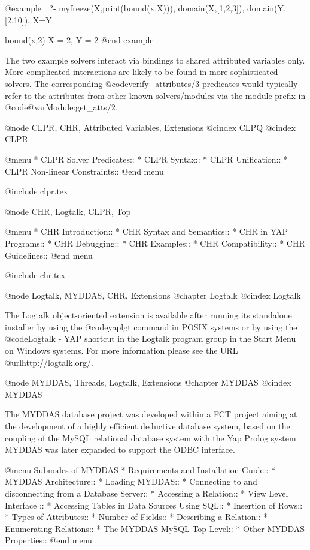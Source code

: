{{{{{{{{{@example
| ?- myfreeze(X,print(bound(x,X))), domain(X,[1,2,3]),
     domain(Y,[2,10]), X=Y.

bound(x,2)                      %
X = 2,                          %
Y = 2
@end example

The two example solvers interact via bindings to shared attributed
variables only.  More complicated interactions are likely to be found
in more sophisticated solvers.  The corresponding
@code{verify_attributes/3} predicates would typically refer to the
attributes from other known solvers/modules via the module prefix in
@code{@var{Module}:get_atts/2}.

@node CLPR, CHR, Attributed Variables, Extensions
@cindex CLPQ
@cindex CLPR

@menu
* CLPR Solver Predicates::
* CLPR Syntax::
* CLPR Unification::
* CLPR Non-linear Constraints::               
@end menu

@include clpr.tex

@node CHR, Logtalk, CLPR, Top

@menu
* CHR Introduction::            
* CHR Syntax and Semantics::
* CHR in YAP Programs::
* CHR Debugging::               
* CHR Examples::       
* CHR Compatibility::     
* CHR Guidelines::  
@end menu

@include chr.tex

@node Logtalk, MYDDAS, CHR, Extensions
@chapter Logtalk
@cindex Logtalk

The Logtalk object-oriented extension is available after running its 
standalone installer by using the @code{yaplgt} command in POSIX 
systems or by using the @code{Logtalk - YAP} shortcut in the Logtalk 
program group in the Start Menu on Windows systems. For more information 
please see the URL @url{http://logtalk.org/}.

@node MYDDAS, Threads, Logtalk, Extensions
@chapter MYDDAS
@cindex MYDDAS

The MYDDAS database project was developed within a FCT project aiming at
the development of a highly efficient deductive database system, based
on the coupling of the MySQL relational database system with the Yap
Prolog system. MYDDAS was later expanded to support the ODBC interface.

@menu
Subnodes of MYDDAS
* Requirements and Installation Guide:: 
* MYDDAS Architecture:: 
* Loading MYDDAS:: 
* Connecting to and disconnecting from a Database Server:: 
* Accessing a Relation:: 
* View Level Interface :: 
* Accessing Tables in Data Sources Using SQL:: 
* Insertion of Rows:: 
* Types of Attributes:: 
* Number of Fields:: 
* Describing a Relation:: 
* Enumerating Relations:: 
* The MYDDAS MySQL Top Level:: 
* Other MYDDAS Properties:: 
@end menu

}}}}}}}}}
